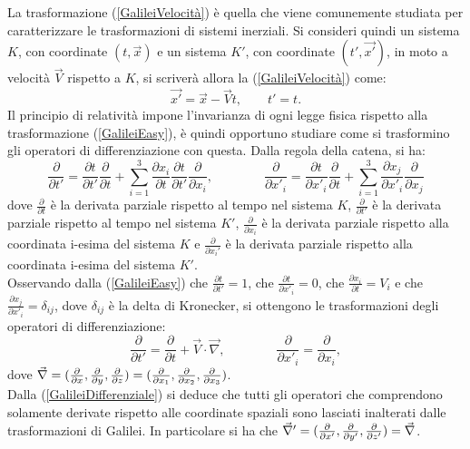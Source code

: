 La trasformazione (\ref{GalileiVelocità}) è quella che viene comunemente studiata per caratterizzare le trasformazioni di sistemi inerziali. 
Si consideri quindi un sistema $K$, con coordinate $(t,\vec{x})$ e un sistema $K'$, con 
coordinate $(t',\vec{x'})$, in moto a velocità $\vec{V}$ rispetto a $K$, si scriverà allora la 
(\ref{GalileiVelocità}) come:
\begin{equation}
	\vec{x'}=\vec{x}-\vec{V}t, \qquad t'=t.
	\label{GalileiEasy}
\end{equation}
Il principio di relatività impone l'invarianza di ogni legge fisica rispetto alla trasformazione (\ref{GalileiEasy}), è quindi opportuno
studiare come si trasformino gli operatori di differenziazione con questa.
Dalla regola della catena, si ha:
\begin{equation*}
		\frac{\partial}{\partial t'}=\frac{\partial t}{\partial t'}\frac{\partial}{\partial t}+
		\sum_{i=1}^{3}\frac{\partial x_i}{\partial t}\frac{\partial t}{\partial t'}
		\frac{\partial}{\partial x_i}, \qquad \qquad
		\frac{\partial}{\partial x'_i}=\frac{\partial t}{\partial x'_i}\frac{\partial}{\partial t}+
		\sum_{i=1}^{3}\frac{\partial x_j}{\partial x'_i}\frac{\partial}{\partial x_j}
\end{equation*}
dove $\frac{\partial}{\partial t}$ è la derivata parziale rispetto al tempo nel sistema $K$, $\frac{\partial}{\partial t'}$ è la derivata parziale rispetto al tempo nel sistema $K'$, $\frac{\partial}{\partial x_i}$ è la derivata parziale rispetto alla coordinata i-esima del sistema $K$ e $\frac{\partial}{\partial x_i'}$ è la derivata parziale rispetto alla coordinata i-esima del sistema $K'$.\\Osservando dalla (\ref{GalileiEasy}) che $\frac{\partial t}{\partial t'}=1$, che 
$\frac{\partial t}{\partial x'_i}=0$, che $\frac{\partial x_i}{\partial t}=V_i$ e che 
$\frac{\partial x_j}{\partial x'_i}=\delta_{ij}$, dove $\delta_{ij}$ è la delta di Kronecker, 
si ottengono le trasformazioni degli operatori di differenziazione:
\begin{equation}
	\frac{\partial}{\partial t'}=\frac{\partial}{\partial t}+\vec{V}\cdot\vec{\nabla}, \qquad \qquad
	\frac{\partial}{\partial x'_i}=\frac{\partial}{\partial x_i},
	\label{GalileiDifferenziale}
\end{equation}
dove $\vec{\nabla}=(\frac{\partial }{\partial x},\frac{\partial }{\partial y},\frac{\partial }{\partial z})=(\frac{\partial }{\partial x_1},\frac{\partial }{\partial x_2},\frac{\partial }{\partial x_3})$.\\
Dalla (\ref{GalileiDifferenziale}) si deduce che tutti gli operatori che comprendono solamente derivate 
rispetto alle coordinate spaziali sono lasciati inalterati dalle trasformazioni di Galilei. In particolare si ha che $\vec{\nabla}'=(\frac{\partial }{\partial x'},\frac{\partial }{\partial y'},\frac{\partial }{\partial z'})=\vec{\nabla}$.\\

